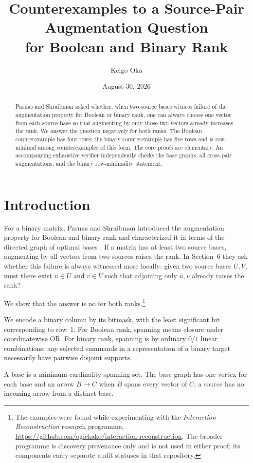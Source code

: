 \documentclass[11pt]{article}
\title{Counterexamples to a Source-Pair Augmentation Question\\for Boolean and Binary Rank}
\author{Keigo Oka}
\date{August 30, 2026}
\begin{document}
\maketitle

\begin{abstract}
Parnas and Shraibman asked whether, when two source bases witness failure of the augmentation property for Boolean or binary rank, one can always choose one vector from each source base so that augmenting by only those two vectors already increases the rank. We answer the question negatively for both ranks. The Boolean counterexample has four rows; the binary counterexample has five rows and is row-minimal among counterexamples of this form. The core proofs are elementary. An accompanying exhaustive verifier independently checks the base graphs, all cross-pair augmentations, and the binary row-minimality statement.
\end{abstract}

\section{Introduction}

For a binary matrix, Parnas and Shraibman introduced the augmentation property for Boolean and binary rank and characterized it in terms of the directed graph of optimal bases \cite{PS}. If a matrix has at least two source bases, augmenting by all vectors from two sources raises the rank. In Section~6 they ask whether this failure is always witnessed more locally: given two source bases $U,V$, must there exist $u\in U$ and $v\in V$ such that adjoining only $u,v$ already raises the rank?

We show that the answer is no for both ranks.\footnote{The examples were found while experimenting with the \emph{Interaction Reconstruction} research programme, \url{https://github.com/ogiekako/interaction-reconstruction}. The broader programme is discovery provenance only and is not used in either proof; its components carry separate audit statuses in that repository.}

We encode a binary column by its bitmask, with the least significant bit corresponding to row~1. For Boolean rank, spanning means closure under coordinatewise OR. For binary rank, spanning is by ordinary $0/1$ linear combinations; any selected summands in a representation of a binary target necessarily have pairwise disjoint supports.

A base is a minimum-cardinality spanning set. The base graph has one vertex for each base and an arrow $B\to C$ when $B$ spans every vector of $C$; a source has no incoming arrow from a distinct base.
\end{document}
